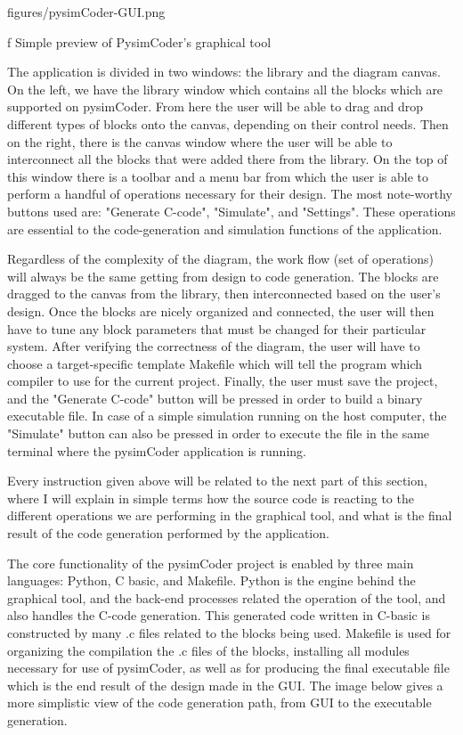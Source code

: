 \medskip {}
\picw=12cm \cinspic figures/pysimCoder-GUI.png
\caption/f Simple preview of PysimCoder's graphical tool
\medskip

\quad The application is divided in two windows: the library and the diagram canvas. On the left, we have the library window 
which contains all the blocks which are supported on pysimCoder. From here the user will be able to drag and drop different 
types of blocks onto the canvas, depending on their control needs. Then on the right, there is the canvas window where the user 
will be able to interconnect all the blocks that were added there from the library. On the top of this window there is a toolbar
and a menu bar from which the user is able to perform a handful of operations necessary for their design. The most note-worthy
buttons used are: "Generate C-code", "Simulate", and "Settings". These operations are essential to the code-generation and
simulation functions of the application.

\quad Regardless of the complexity of the diagram, the work flow (set of operations) will always be the same getting from design 
to code generation. The blocks are dragged to the canvas from the library, then interconnected based on the user's design. 
Once the blocks are nicely organized and connected, the user will then have to tune any block parameters that must be changed for
their particular system. After verifying the correctness of the diagram, the user will have to choose a target-specific template
Makefile which will tell the program which compiler to use for the current project. Finally, the user must save the project, and
the "Generate C-code" button will be pressed in order to build a binary executable file. In case of a simple simulation running
on the host computer, the "Simulate" button can also be pressed in order to execute the file in the same terminal where the
pysimCoder application is running. 

\quad Every instruction given above will be related to the next part of this section, where I will explain in simple terms
how the source code is reacting to the different operations we are performing in the graphical tool, and what is the final result
of the code generation performed by the application. 

\quad The core functionality of the pysimCoder project is enabled  by three main languages: Python, C basic, and Makefile. 
Python is the engine behind the graphical tool, and the back-end processes related the operation of the tool, and also handles the
C-code generation. This generated code written in C-basic is constructed by many .c files related to the blocks being used. 
Makefile is used for organizing the compilation the .c files of the blocks, installing all modules necessary for use of pysimCoder, 
as well as for producing the final executable file which is the end result of the design made in the GUI. The image below gives a 
more simplistic view of the code generation path, from GUI to the executable generation. 

